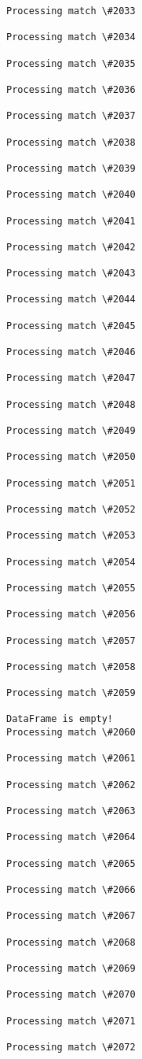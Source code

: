\documentclass[11pt]{article}
\begin{document}
\begin{Verbatim}[commandchars=\\\{\}]
Processing match \#2033

Processing match \#2034

Processing match \#2035

Processing match \#2036

Processing match \#2037

Processing match \#2038

Processing match \#2039

Processing match \#2040

Processing match \#2041

Processing match \#2042

Processing match \#2043

Processing match \#2044

Processing match \#2045

Processing match \#2046

Processing match \#2047

Processing match \#2048

Processing match \#2049

Processing match \#2050

Processing match \#2051

Processing match \#2052

Processing match \#2053

Processing match \#2054

Processing match \#2055

Processing match \#2056

Processing match \#2057

Processing match \#2058

Processing match \#2059

DataFrame is empty!
Processing match \#2060

Processing match \#2061

Processing match \#2062

Processing match \#2063

Processing match \#2064

Processing match \#2065

Processing match \#2066

Processing match \#2067

Processing match \#2068

Processing match \#2069

Processing match \#2070

Processing match \#2071

Processing match \#2072


\end{Verbatim}
\end{document}
